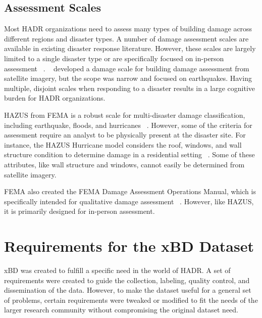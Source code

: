 \documentclass[10pt,twocolumn,letterpaper]{article}
\begin{document}
\subsection{Assessment Scales}
Most HADR organizations need to assess many types of building damage across different regions and disaster types.
A number of damage assessment scales are available in existing disaster response literature. However, these scales are largely limited to a single disaster type or are specifically focused on in-person assessment ~\cite{jiIdentifyingCollapsedBuildings2018, thiekenMethodsEvaluationDirect, okadaClassificationsStructuralTypes1999, friedlandResidentialBuildingDamage2009}. 
~\cite{jiIdentifyingCollapsedBuildings2018} developed a damage scale for building damage assessment from satellite imagery, but the scope was narrow and focused on earthquakes.
Having multiple, disjoint scales when responding to a disaster results in a large cognitive burden for HADR organizations.

HAZUS from FEMA is a robust scale for multi-disaster damage classification, including earthquake, floods, and hurricanes ~\cite{federalemergencymanagementagencyHazusHurricaneModel2018}.
However, some of the criteria for assessment require an analyst to be 
physically present at the disaster site.
For instance, the HAZUS Hurricane model considers the roof, windows, and wall structure condition to determine damage in a residential setting ~\cite{federalemergencymanagementagencyHazusHurricaneModel2018}.
Some of these attributes, like wall structure and windows, cannot easily be determined from satellite imagery. 

FEMA also created the FEMA Damage Assessment Operations Manual, which is specifically intended for qualitative damage assessment ~\cite{federalemergencymanagementagencyDamageAssessmentOperations2016}.
However, like HAZUS, it is primarily designed for in-person assessment. 

\section{Requirements for the xBD Dataset}\label{sec:requirements}
xBD was created to fulfill a specific need in the world of HADR.
A set of requirements were created to guide the collection, labeling, quality control, and dissemination of the data.
However,  to make the dataset useful for a general set of problems, certain requirements were tweaked or modified to fit the needs of the larger research community without compromising the original dataset need.
\end{document}
